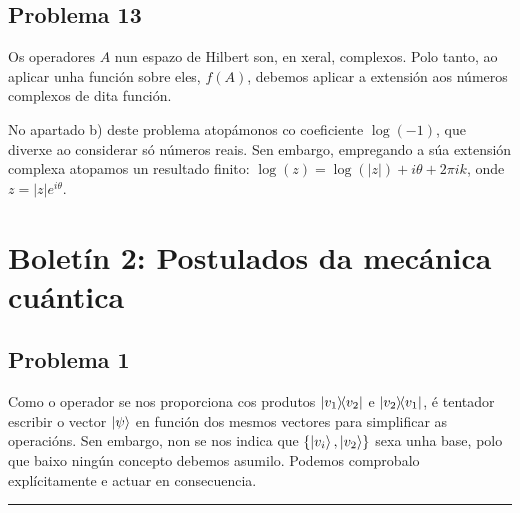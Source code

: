 \documentclass[a4paper,12pt]{article}
\begin{document}
\subsection*{Problema 13}

Os operadores $A$ nun espazo de Hilbert son, en xeral, complexos. Polo tanto, ao aplicar unha función sobre eles, $f(A)$, debemos aplicar a extensión aos números complexos de dita función.

No apartado b) deste problema atopámonos co coeficiente $\log(-1)$, que diverxe ao considerar só números reais. Sen embargo, empregando a súa extensión complexa atopamos un resultado finito: $\log(z) = \log(|z|) + i \theta + 2\pi i k$, onde $z = |z|e^{i\theta}$.

\newpage
\section*{Boletín 2: Postulados da mecánica cuántica}

\subsection*{Problema 1}

Como o operador se nos proporciona cos produtos $\ketbra{v_1}{v_2}$ e $\ketbra{v_2}{v_1}$, é tentador escribir o vector $\ket{\psi}$ en función dos mesmos vectores para simplificar as operacións. Sen embargo, non se nos indica que $\{ \ket{v_i}, \ket{v_2} \}$ sexa unha base, polo que baixo ningún concepto debemos asumilo. Podemos comprobalo explícitamente e actuar en consecuencia.

\begin{center} \hrule \end{center}
\end{document}
